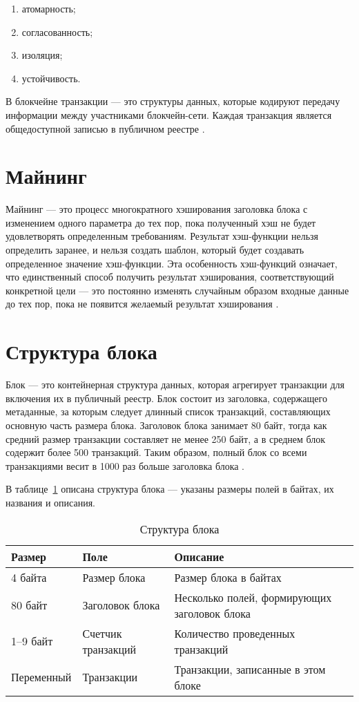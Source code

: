\documentclass{bmstu}
\begin{document}
\begin{enumerate}
\item[1)]
атомарность;
\item[2)]
согласованность;
\item[3)]
изоляция;
\item[4)]
устойчивость.
\end{enumerate}

В блокчейне транзакции --- это структуры данных, которые кодируют передачу информации между участниками блокчейн-сети. 
Каждая транзакция является общедоступной записью в публичном реестре \cite[111]{Antonopoulos2010}.

\section{Майнинг}

Майнинг --- это процесс многократного хэширования заголовка блока с изменением одного параметра до тех пор, пока полученный хэш не будет удовлетворять определенным требованиям. 
Результат хэш-функции нельзя определить заранее, и нельзя создать шаблон, который будет создавать определенное значение хэш-функции. 
Эта особенность хэш-функций означает, что единственный способ получить результат хэширования, соответствующий конкретной цели --- это постоянно изменять случайным образом входные данные до тех пор, пока не появится желаемый результат хэширования \cite[192]{Antonopoulos2010}.

\section{Структура блока}

Блок --- это контейнерная структура данных, которая агрегирует транзакции для включения их в публичный реестр. Блок состоит из заголовка, содержащего метаданные, за которым следует длинный список транзакций, составляющих основную часть размера блока. Заголовок блока занимает 80 байт, тогда как средний размер транзакции составляет не менее 250 байт, а в среднем блок содержит более 500 транзакций. Таким образом, полный блок со всеми транзакциями весит в 1000 раз больше заголовка блока \cite[164]{Antonopoulos2010}.

В таблице~\ref{tabular:blockstructure} описана структура блока --- указаны размеры полей в байтах, их названия и описания.

\begin{table}[H]
\caption{Структура блока}
\label{tabular:blockstructure}
\begin{tabular}{|p{3.5cm}|p{4.5cm}|p{7cm}|}
\hline
\textbf{Размер} & \textbf{Поле} & \textbf{Описание}
\tabularnewline
\hline
4 байта & Размер блока & Размер блока в байтах
\tabularnewline
\hline
80 байт & Заголовок блока & Несколько полей, формирующих заголовок блока
\tabularnewline
\hline
1--9 байт & Счетчик транзакций & Количество проведенных транзакций
\tabularnewline
\hline
Переменный & Транзакции & Транзакции, записанные в этом блоке
\tabularnewline
\hline
\end{tabular}
\end{table}
\end{document}
